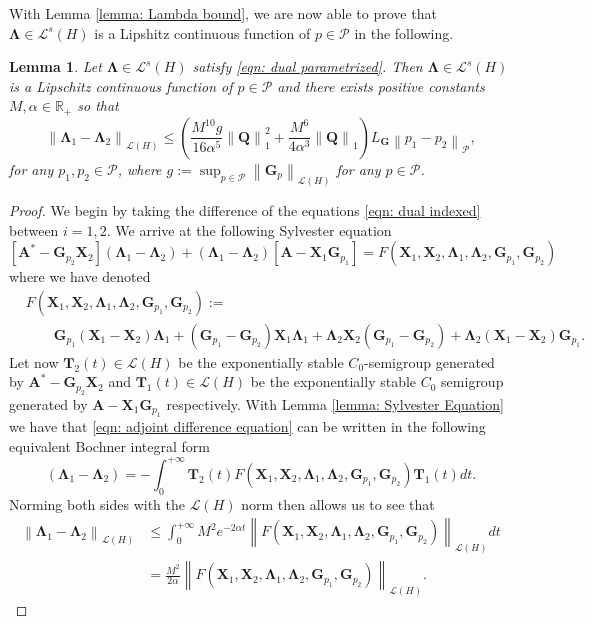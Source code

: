 \documentclass{amsart}
\newcommand{\sL}{\mathscr L}
\newcommand{\p}[1]{\left( {#1} \right)}
\newcommand{\norm}[1]{\left\| #1 \right\|}
\newcommand{\br}[1]{\left[ #1 \right]}
\newcommand{\sP}{\mathcal{P}}
\newcommand{\bA}{\mathbf A}
\newcommand{\bX}{\mathbf X}
\newcommand{\bQ}{\mathbf Q}
\newcommand{\bG}{\mathbf G}
\newcommand{\bT}{\mathbf T}
\newcommand{\bLambda}{\boldsymbol{\Lambda}}
\newtheorem{lemma}{Lemma}
\begin{document}
With Lemma \ref{lemma: Lambda bound}, we are now able to prove that $\bLambda \in \sL^s(H)$ is a Lipshitz continuous function of $p \in \sP$ in the following.
\begin{lemma} \label{lemma: Lambda Difference bound}
    Let $\bLambda \in \sL^s(H)$ satisfy \eqref{eqn: dual parametrized}. Then $\bLambda \in \sL^s(H)$ is a Lipschitz continuous function of $p \in \sP$ and there exists positive constants $M, \alpha \in \mathbb R_+$ so that
    $$
        \norm{\bLambda_{1} - \bLambda_{2}}_{\sL\p{H}} \leq \p{\frac{M^{10}g}{16\alpha^5}\norm{\bQ}^2_1 
        + \frac{M^6}{4\alpha^3}\norm{\bQ}_1 }L_{\bG} \norm{p_1 - p_2}_{\sP},
    $$
    for any $p_1, p_2 \in \sP$, where $g := \sup_{p\in\sP}\norm{\bG_p}_{\sL(H)}$ for any $p \in \sP$.
\end{lemma}
\begin{proof}
    We begin by taking the difference of the equations \eqref{eqn: dual indexed} between $i=1,2$. We arrive at the following Sylvester equation
    \begin{equation} \label{eqn: adjoint difference equation}
        \br{\bA^* - \bG_{p_2}\bX_2}\p{\bLambda_1 - \bLambda_2} + \p{\bLambda_1 - \bLambda_2}\br{\bA - \bX_1\bG_{p_1}} 
        = F(\bX_1, \bX_2, \bLambda_1, \bLambda_2, \bG_{p_1}, \bG_{p_2})
    \end{equation}
    where we have denoted
    $$
    \begin{aligned}
        &F(\bX_1, \bX_2, \bLambda_1, \bLambda_2, \bG_{p_1}, \bG_{p_2}) := \\
        & \qquad 
        \bG_{p_1}(\bX_1-\bX_2)\bLambda_1 
        + (\bG_{p_1} - \bG_{p_2})\bX_1\bLambda_1 
        + \bLambda_2 \bX_2(\bG_{p_1}-\bG_{p_2}) 
        + \bLambda_2(\bX_1 - \bX_2)\bG_{p_1}. 
    \end{aligned}
    $$
    Let now $\bT_2(t) \in \sL\p{H}$ be the exponentially stable $C_0$-semigroup generated by $\bA^* - \bG_{p_2}\bX_2$ and $\bT_1(t) \in \sL\p{H}$ be the exponentially stable $C_0$ semigroup generated by $\bA - \bX_1\bG_{p_1}$ respectively. With Lemma \ref{lemma: Sylvester Equation} we have that \eqref{eqn: adjoint difference equation} can be written in the following equivalent Bochner integral form
    $$
        (\bLambda_1 - \bLambda_2) = -\int_0^{+\infty} \bT_2(t) F\p{\bX_1, \bX_2, \bLambda_1, \bLambda_2, \bG_{p_1}, \bG_{p_2}} \bT_1(t) dt.
    $$
    Norming both sides with the $\sL\p{H}$ norm then allows us to see that 
    \begin{equation} \label{eqn: AAA}
    \begin{aligned}
        \norm{\bLambda_1 - \bLambda_2}_{\sL\p{H}} &\leq \int_0^{+\infty} M^2 e^{-2\alpha t } \norm{F(\bX_1, \bX_2, \bLambda_1, \bLambda_2, \bG_{p_1}, \bG_{p_2})}_{\sL\p{H}} dt \\
        &= \frac{M^2}{2\alpha} \norm{F(\bX_1, \bX_2, \bLambda_1, \bLambda_2, \bG_{p_1}, \bG_{p_2})}_{\sL\p{H}}.
    \end{aligned}
    \end{equation}
    

\end{proof}
\end{document}

